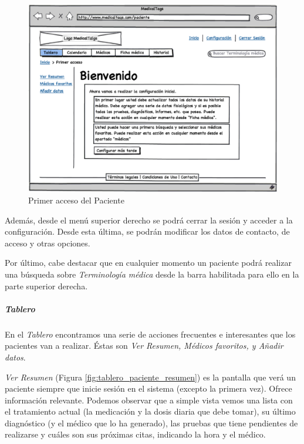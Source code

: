 		\begin{figure}[H]
		  \centering
		    \includegraphics[width=12cm]{img/eps/25_Tablero_Paciente.eps}
		  \caption{Primer acceso del Paciente}
		  \label{fig:tablero_paciente_inicial}
		\end{figure}
	
		Además, desde el menú superior derecho se podrá cerrar la sesión y acceder a la configuración. Desde esta última, se podrán modificar los datos de contacto, de acceso y otras opciones.
		
		 Por último, cabe destacar que en cualquier momento un paciente podrá realizar una búsqueda sobre \textit{Terminología médica} desde la barra habilitada para ello en la parte superior derecha.
	
		\subparagraph{Tablero} %
		\label{par:paciente_tablero}
		En el \textit{Tablero} encontramos una serie de acciones frecuentes e interesantes que los pacientes van a realizar. Éstas son \textit{Ver Resumen, Médicos favoritos, y Añadir datos}.
		
		\textit{Ver Resumen} (Figura \ref{fig:tablero_paciente_resumen}) es la pantalla que verá un paciente siempre que inicie sesión en el sistema (excepto la primera vez). Ofrece información relevante. Podemos observar que a simple vista vemos una lista con el tratamiento actual (la medicación y la dosis diaria que debe tomar), su último diagnóstico (y el médico que lo ha generado), las pruebas que tiene pendientes de realizarse y cuáles son sus próximas citas, indicando la hora y el médico.
	
